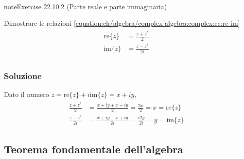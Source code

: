 \documentclass[letterpaper,10pt,italian]{jupyterBook}
\begin{document}
\begin{sphinxadmonition}{note}{Exercise 22.10.2 (Parte reale e parte immaginaria)}



\sphinxAtStartPar
Dimostrare le relazioni \eqref{equation:ch/algebra/complex-algebra:complex:cc:re-im}
\begin{equation*}
\begin{split}\begin{aligned}
  \text{re}\{z\} & = \frac{z + z^*}{2} \\
  \text{im}\{z\} & = \frac{z - z^*}{2i} \\
\end{aligned}\end{split}
\end{equation*}\subsubsection*{Soluzione}

\sphinxAtStartPar
Dato il numero \(z = \text{re}\{z\} + i \text{im}\{z\} = x + i y\),
\begin{equation*}
\begin{split}\begin{aligned}
 \frac{z + z^*}{2}  & = \frac{x+iy+x-iy}{2}  = \frac{2x}{2} = x = \text{re}\{z\} \\
 \frac{z - z^*}{2i} & = \frac{x+iy-x+iy}{2i} = \frac{i2y}{2i} = y = \text{im}\{z\}
\end{aligned}\end{split}
\end{equation*}\end{sphinxadmonition}


\subsection{Teorema fondamentale dell’algebra}
\label{\detokenize{ch/algebra/complex-algebra-problems:teorema-fondamentale-dell-algebra}}\label{\detokenize{ch/algebra/complex-algebra-problems:math-hs-algebra-complex-problems-fund-thm}} \label{exercise:ch/algebra/complex-algebra-problems-exercise-2}
\end{document}

